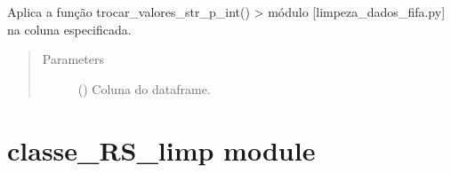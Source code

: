 \documentclass[letterpaper,10pt,brazil]{sphinxmanual}
\begin{document}
\begin{fulllineitems}

\begin{fulllineitems}
\label{\detokenize{classe_Fifa_limp:id8}}
Aplica a função trocar\_valores\_str\_p\_int() \sphinxhyphen{}\textgreater{} módulo {[}limpeza\_dados\_fifa.py{]}\sphinxhyphen{} na coluna especificada.
\begin{quote}\begin{description}
\item[{Parameters}] \leavevmode
{} () \textendash{} Coluna do dataframe.

\end{description}\end{quote}

\end{fulllineitems}


\end{fulllineitems}



\section{classe\_RS\_limp module}
\label{\detokenize{classe_RS_limp:module-classe_RS_limp}}\label{\detokenize{classe_RS_limp:classe-rs-limp-module}}\label{\detokenize{classe_RS_limp::doc}}
\end{document}

